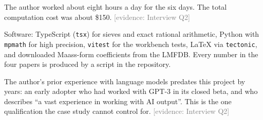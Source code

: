 \documentclass[11pt,a4paper]{article}
\newcommand{\evidence}[1]{{\footnotesize\textcolor{Gray}{[evidence: #1]}}}
\newcommand{\file}[1]{\texttt{#1}}
\begin{document}
The author worked about eight hours a day for the six days. The total computation cost was about
\$150. \evidence{Interview Q2}

Software: TypeScript (\file{tsx}) for sieves and exact rational arithmetic, Python with \file{mpmath} for high
precision, \file{vitest} for the workbench tests, \LaTeX{} via \file{tectonic}, and downloaded Maass-form
coefficients from the LMFDB. Every number in the four papers is produced by a script in the repository.

The author's prior experience with language models predates this project by years: an early adopter who had
worked with GPT-3 in its closed beta, and who describes ``a vast experience in working with AI output''. This is
the one qualification the case study cannot control for. \evidence{Interview Q2}
\end{document}
